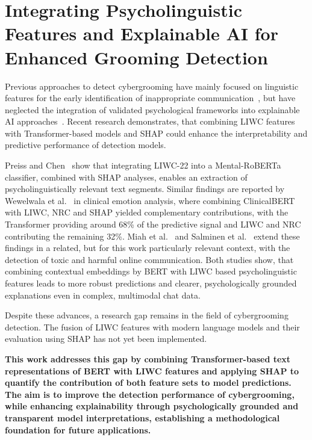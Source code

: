 
\section{Integrating Psycholinguistic Features and Explainable AI for Enhanced Grooming Detection}
Previous approaches to detect cybergrooming have mainly focused on linguistic features for the early identification of inappropriate communication~\cite{yakut-kilic-pan-2022-incorporating}, but have neglected the integration of validated psychological frameworks into explainable AI approaches~\cite{broome2020psycholinguistic}. Recent research demonstrates, that combining LIWC features with Transformer-based models and SHAP could enhance the interpretability and predictive performance of detection models.

Preiss and Chen~\cite{preiss-chen-2024-incorporating} show that integrating LIWC-22 into a Mental-RoBERTa classifier, combined with SHAP analyses, enables an extraction of psycholinguistically relevant text segments. Similar findings are reported by Wewelwala et al.~\cite{wewelwala2025hybrid} in clinical emotion analysis, where combining ClinicalBERT with LIWC, NRC and SHAP yielded complementary contributions, with the Transformer providing around 68\% of the predictive signal and LIWC and NRC contributing the remaining 32\%. 
Miah et al.~\cite{miah-etal-2011-detection} and Salminen et al.~\cite{salminen2025} extend these findings in a related, but for this work particularly relevant context, with the detection of toxic and harmful online communication. Both studies show, that combining contextual embeddings by BERT with LIWC based psycholinguistic features leads to more robust predictions and clearer, psychologically grounded explanations even in complex, multimodal chat data.

Despite these advances, a research gap remains in the field of cybergrooming detection. The fusion of LIWC features with modern language models and their evaluation using SHAP has not yet been implemented.

\textbf{This work addresses this gap by combining Transformer-based text representations of BERT with LIWC features and applying SHAP to quantify the contribution of both feature sets to model predictions. The aim is to improve the detection performance of cybergrooming, while enhancing explainability through psychologically grounded and transparent model interpretations, establishing a methodological foundation for future applications.}







